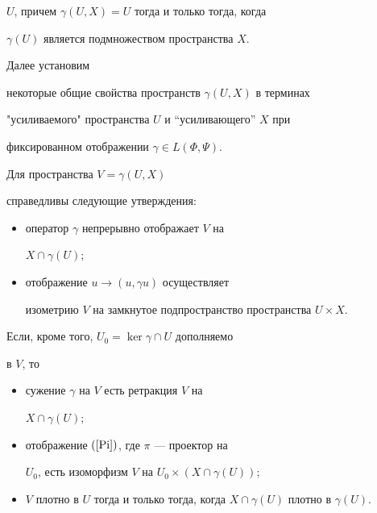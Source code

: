 $U$, причем $\gamma (U,X)=U$ тогда и только тогда, когда


$\gamma(U)$ является подмножеством пространства $X$.





Далее установим


некоторые общие свойства пространств $\gamma(U,X)$ в терминах


"усиливаемого" пространства $U$ и ``усиливающего'' $X$ при


фиксированном отображении $\gamma \in L(\Phi, \Psi)$.





\begin{thms} \label{t1}


Для пространства $V=\gamma(U, X)$


справедливы следующие утверждения\/${:}$


\begin{itemize}


\item[(i)] оператор $\gamma$ непрерывно отображает $V$ на


$X \cap \gamma(U);$


\item[(ii)] отображение $u \rightarrow (u, \gamma u)$ осуществляет


изометрию $V$ на замкнутое подпространство пространства $U \times


X$.


\end{itemize}


Если, кроме того, $U_0=\ker \gamma \cap U$ дополняемо


в $V$, то


\begin{itemize}


\item[(iii)] сужение $\gamma$ на $V$ есть ретракция $V$ на


$X \cap \gamma(U);$


\item[(iv)] отображение $(\ref{Pi})$, где $\pi$ --- проектор на


$U_0$, есть изоморфизм $V$ на $U_0 \times (X \cap \gamma(U));$


\item[(v)] $V$ плотно в $U$ тогда и только тогда, когда $X \cap


\gamma(U)$ плотно в $\gamma(U)$.


\end{itemize}


\end{thms}






